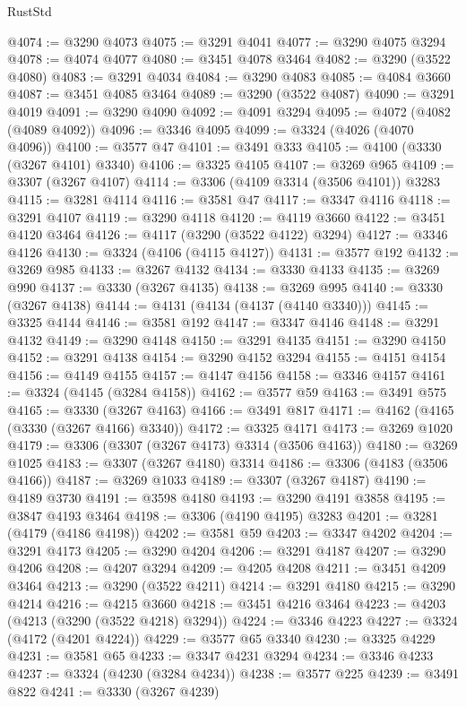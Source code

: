 \begin{lexlean}{RustStd}
\begin{coremodule}
@4074 := @3290 @4073
@4075 := @3291 @4041
@4077 := @3290 @4075 @3294
@4078 := @4074 @4077
@4080 := @3451 @4078 @3464
@4082 := @3290 (@3522 @4080)
@4083 := @3291 @4034
@4084 := @3290 @4083
@4085 := @4084 @3660
@4087 := @3451 @4085 @3464
@4089 := @3290 (@3522 @4087)
@4090 := @3291 @4019
@4091 := @3290 @4090
@4092 := @4091 @3294
@4095 := @4072 (@4082 (@4089 @4092))
@4096 := @3346 @4095
@4099 := @3324 (@4026 (@4070 @4096))
@4100 := @3577 @47
@4101 := @3491 @333
@4105 := @4100 (@3330 (@3267 @4101) @3340)
@4106 := @3325 @4105
@4107 := @3269 @965
@4109 := @3307 (@3267 @4107)
@4114 := @3306 (@4109 @3314 (@3506 @4101)) @3283
@4115 := @3281 @4114
@4116 := @3581 @47
@4117 := @3347 @4116
@4118 := @3291 @4107
@4119 := @3290 @4118
@4120 := @4119 @3660
@4122 := @3451 @4120 @3464
@4126 := @4117 (@3290 (@3522 @4122) @3294)
@4127 := @3346 @4126
@4130 := @3324 (@4106 (@4115 @4127))
@4131 := @3577 @192
@4132 := @3269 @985
@4133 := @3267 @4132
@4134 := @3330 @4133
@4135 := @3269 @990
@4137 := @3330 (@3267 @4135)
@4138 := @3269 @995
@4140 := @3330 (@3267 @4138)
@4144 := @4131 (@4134 (@4137 (@4140 @3340)))
@4145 := @3325 @4144
@4146 := @3581 @192
@4147 := @3347 @4146
@4148 := @3291 @4132
@4149 := @3290 @4148
@4150 := @3291 @4135
@4151 := @3290 @4150
@4152 := @3291 @4138
@4154 := @3290 @4152 @3294
@4155 := @4151 @4154
@4156 := @4149 @4155
@4157 := @4147 @4156
@4158 := @3346 @4157
@4161 := @3324 (@4145 (@3284 @4158))
@4162 := @3577 @59
@4163 := @3491 @575
@4165 := @3330 (@3267 @4163)
@4166 := @3491 @817
@4171 := @4162 (@4165 (@3330 (@3267 @4166) @3340))
@4172 := @3325 @4171
@4173 := @3269 @1020
@4179 := @3306 (@3307 (@3267 @4173) @3314 (@3506 @4163))
@4180 := @3269 @1025
@4183 := @3307 (@3267 @4180) @3314
@4186 := @3306 (@4183 (@3506 @4166))
@4187 := @3269 @1033
@4189 := @3307 (@3267 @4187)
@4190 := @4189 @3730
@4191 := @3598 @4180
@4193 := @3290 @4191 @3858
@4195 := @3847 @4193 @3464
@4198 := @3306 (@4190 @4195) @3283
@4201 := @3281 (@4179 (@4186 @4198))
@4202 := @3581 @59
@4203 := @3347 @4202
@4204 := @3291 @4173
@4205 := @3290 @4204
@4206 := @3291 @4187
@4207 := @3290 @4206
@4208 := @4207 @3294
@4209 := @4205 @4208
@4211 := @3451 @4209 @3464
@4213 := @3290 (@3522 @4211)
@4214 := @3291 @4180
@4215 := @3290 @4214
@4216 := @4215 @3660
@4218 := @3451 @4216 @3464
@4223 := @4203 (@4213 (@3290 (@3522 @4218) @3294))
@4224 := @3346 @4223
@4227 := @3324 (@4172 (@4201 @4224))
@4229 := @3577 @65 @3340
@4230 := @3325 @4229
@4231 := @3581 @65
@4233 := @3347 @4231 @3294
@4234 := @3346 @4233
@4237 := @3324 (@4230 (@3284 @4234))
@4238 := @3577 @225
@4239 := @3491 @822
@4241 := @3330 (@3267 @4239)

\end{coremodule}
\end{lexlean}
